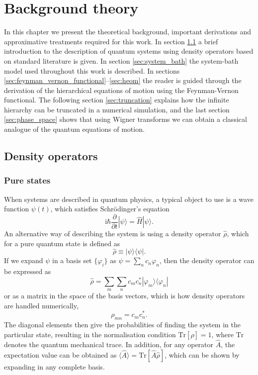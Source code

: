 \chapter{Background theory}
In this chapter we present the theoretical background, important derivations and approximative treatments required for this work. In section \ref{sec:density_operators} a brief introduction to the description of quantum systems using density operators based on standard literature is given.\supercite{Ballentine1998,Zwanzig2001,Weiss2012,Nitzan2013,Sakurai2017} In section \ref{sec:system_bath} the system-bath model used throughout this work is described. In sections \ref{sec:feynman_vernon_functional}--\ref{sec:heom} the reader is guided through the derivation of the hierarchical equations of motion using the Feynman-Vernon functional. The following section \ref{sec:truncation} explains how the infinite hierarchy can be truncated in a numerical simulation, and the last section \ref{sec:phase_space} shows that using Wigner transforms we can obtain a classical analogue of the quantum equations of motion.
\section{Density operators} \label{sec:density_operators}
\subsection{Pure states}
When systems are described in quantum physics, a typical object to use is a wave function $\psi(t)$, which satisfies Schr\"odinger's equation
\begin{equation}
	\mathrm{i}\hbar\frac{\partial}{\partial t} |\psi\rangle= \hat{H}|\psi\rangle.
\end{equation}
An alternative way of describing the system is using a density operator $\hat{\rho}$, which for a pure quantum state is defined as
\begin{equation}
	\hat{\rho} \equiv |\psi\rangle\langle\psi|.
\end{equation}
If we expand $\psi$ in a basis set $\{\varphi_i\}$ as $\psi = \sum_{n} c_n \varphi_n$, then the density operator can be expressed as
\begin{equation}
	\hat{\rho} = \sum_m \sum_n c_m c_n^* |\varphi_m\rangle\langle\varphi_n|
\end{equation}
or as a matrix in the space of the basis vectors, which is how density operators are handled numerically,
\begin{equation}
	\rho_{mn} = c_m c_n^*.
\end{equation}
The diagonal elements then give the probabilities of finding the system in the particular state, resulting in the normalisation condition $\mathrm{Tr}[\hat{\rho}] = 1$, where $\mathrm{Tr}$ denotes the quantum mechanical trace. In addition, for any operator $\hat{A}$, the expectation value can be obtained as $\langle \hat{A} \rangle = \mathrm{Tr}[\hat{A}\hat{\rho}]$, which can be shown by expanding in any complete basis.

